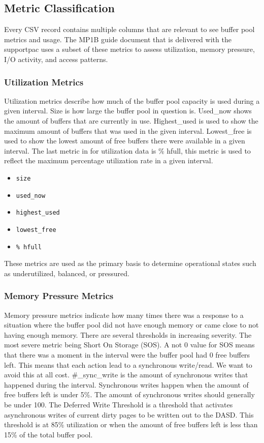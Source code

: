 \subsection{Metric Classification}

Every CSV record contains multiple columns that are relevant to see buffer pool metrics and usage. The MP1B guide document that is delivered with the supportpac uses a subset of these metrics to assess utilization, memory pressure, I/O activity, and access patterns. 

\subsubsection{Utilization Metrics}

Utilization metrics describe how much of the buffer pool capacity is used during a given interval. Size is how large the buffer pool in question is. Used\_now shows the amount of buffers that are currently in use. Highest\_used is used to show the maximum amount of buffers that was used in the given interval. Lowest\_free is used to show the lowest amount of free buffers there were available in a given interval. The last metric in for utilization data is \% hfull, this metric is used to reflect the maximum percentage utilization rate in a given interval. 

\begin{itemize}
    \item \texttt{size}
    \item \texttt{used\_now}
    \item \texttt{highest\_used}
    \item \texttt{lowest\_free}
    \item \texttt{\% hfull}
\end{itemize}

These metrics are used as the primary basis to determine operational states such as underutilized, balanced, or pressured.

\subsubsection{Memory Pressure Metrics}

Memory pressure metrics indicate how many times there was a response to a situation where the buffer pool did not have enough memory or came close to not having enough memory. There are several thresholds in increasing severity. The most severe metric being Short On Storage (SOS). A not 0 value for SOS means that there was a moment in the interval were the buffer pool had 0 free buffers left. This means that each action lead to a synchronous write/read. We want to avoid this at all cost. \#\_sync\_write is the amount of synchronous writes that happened during the interval. Synchronous writes happen when the amount of free buffers left is under 5\%. The amount of synchronous writes should generally be under 100. The Deferred Write Threshold is a threshold that activates asynchronous writes of current dirty pages to be written out to the DASD. This threshold is at 85\% utilization or when the amount of free buffers left is less than 15\% of the total buffer pool.

